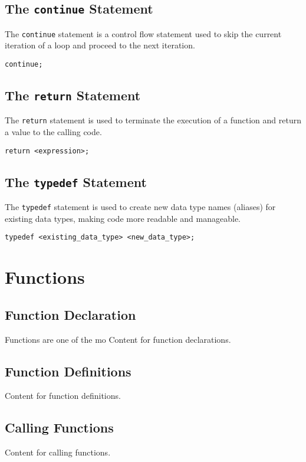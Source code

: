 \documentclass[11pt,A4]{article}
\begin{document}
        \subsection{The \texttt{continue} Statement}
        The \texttt{continue} statement is a control flow statement used to skip the current iteration of a loop and proceed to the next iteration. 
        \begin{lstlisting}
continue;
        \end{lstlisting}
        
        \subsection{The \texttt{return} Statement}
        The \texttt{return} statement is used to terminate the execution of a function and return a value to the calling code.
        \begin{lstlisting}
return <expression>;
        \end{lstlisting}
        
        \subsection{The \texttt{typedef} Statement}
        The \texttt{typedef} statement is used to create new data type names (aliases) for existing data types, making code more readable and manageable.
        \begin{lstlisting}
typedef <existing_data_type> <new_data_type>;
        \end{lstlisting}

    \newpage
    \section{Functions}
        \subsection{Function Declaration}
        Functions are one of the mo
        Content for function declarations.
        
        \subsection{Function Definitions}
        Content for function definitions.
        
        \subsection{Calling Functions}
        Content for calling functions.
        
\end{document}
